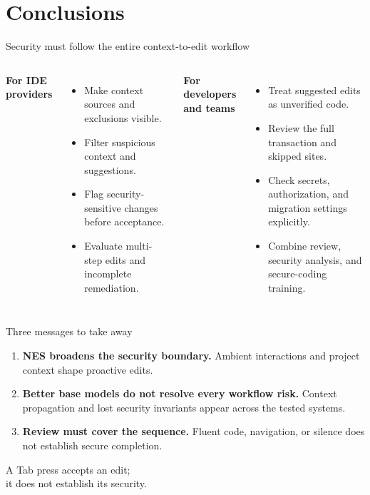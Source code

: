\section{Conclusions}
\begin{frame}{Security must follow the entire context-to-edit workflow}
\begin{columns}[T]
\textbf{For IDE providers}
\begin{itemize}
\item Make context sources and exclusions visible.
\item Filter suspicious context and suggestions.
\item Flag security-sensitive changes before acceptance.
\item Evaluate multi-step edits and incomplete remediation.
\end{itemize}
\textbf{For developers and teams}
\begin{itemize}
\item Treat suggested edits as unverified code.
\item Review the full transaction and skipped sites.
\item Check secrets, authorization, and migration settings explicitly.
\item Combine review, security analysis, and secure-coding training.
\end{itemize}
\end{columns}
\end{frame}

\begin{frame}{Three messages to take away}
\begin{enumerate}
\item \textbf{NES broadens the security boundary.} Ambient interactions and project context shape proactive edits.
\item \textbf{Better base models do not resolve every workflow risk.} Context propagation and lost security invariants appear across the tested systems.
\item \textbf{Review must cover the sequence.} Fluent code, navigation, or silence does not establish secure completion.
\end{enumerate}
\bigskip
\centering\Large\color{Teal}A Tab press accepts an edit;\\it does not establish its security.
\end{frame}
